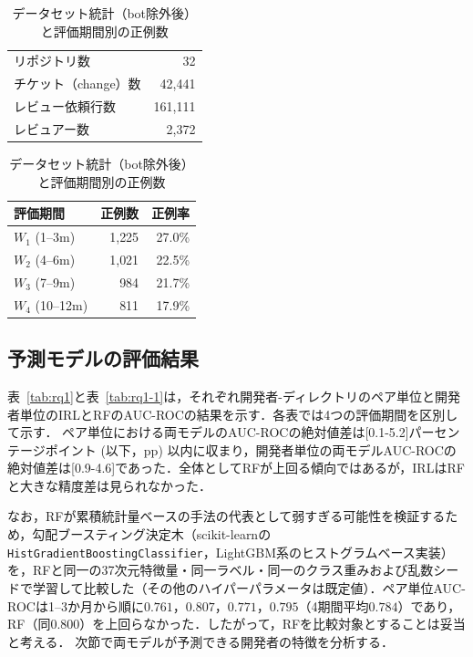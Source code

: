 \documentclass[submit,noauthor,ses,dvipdfmx]{ipsj}
\newcommand{\fixstart}{\color{magenta}}
\newcommand{\fixend}{\color{black}}
\begin{document}
\begin{table}[t]
\caption{データセット統計（bot除外後）と評価期間別の正例数}
\label{tab:dataset}
\centering
\footnotesize
\begin{tabular}{lr}
\hline
リポジトリ数 & 32 \\
チケット（change）数 & 42{,}441 \\
レビュー依頼行数 & 161{,}111 \\
レビュアー数 & 2{,}372 \\
\hline
\end{tabular}
\hspace{2mm}
\begin{tabular}{lrr}
\hline
評価期間 & 正例数 & 正例率 \\
\hline
$W_1$ (1--3m) & 1{,}225 & 27.0\% \\
$W_2$ (4--6m) & 1{,}021 & 22.5\% \\
$W_3$ (7--9m) & 984 & 21.7\% \\
$W_4$ (10--12m) & 811 & 17.9\% \\
\hline
\end{tabular}
\end{table}
\fixend

\vspace{-2mm}
\subsection{予測モデルの評価結果}

表~\ref{tab:rq1}と表~\ref{tab:rq1-1}は，それぞれ開発者-ディレクトリのペア単位と開発者単位のIRLとRFのAUC-ROCの結果を示す．各表では4つの評価期間を区別して示す．
ペア単位における両モデルのAUC-ROCの絶対値差は[0.1-5.2]パーセンテージポイント (以下，pp) 以内に収まり，開発者単位の両モデルAUC-ROCの絶対値差は[0.9-4.6]であった．全体としてRFが上回る傾向ではあるが，IRLはRFと大きな精度差は見られなかった．

\fixstart なお，RFが累積統計量ベースの手法の代表として弱すぎる可能性を検証するため，勾配ブースティング決定木（scikit-learnの\texttt{HistGradientBoostingClassifier}，LightGBM系のヒストグラムベース実装）を，RFと同一の37次元特徴量・同一ラベル・同一のクラス重みおよび乱数シードで学習して比較した（その他のハイパーパラメータは既定値）．ペア単位AUC-ROCは1--3か月から順に$0.761$，$0.807$，$0.771$，$0.795$（4期間平均$0.784$）であり，RF（同$0.800$）を上回らなかった．したがって，RFを比較対象とすることは妥当と考える．\fixend
次節で両モデルが予測できる開発者の特徴を分析する．
\end{document}
